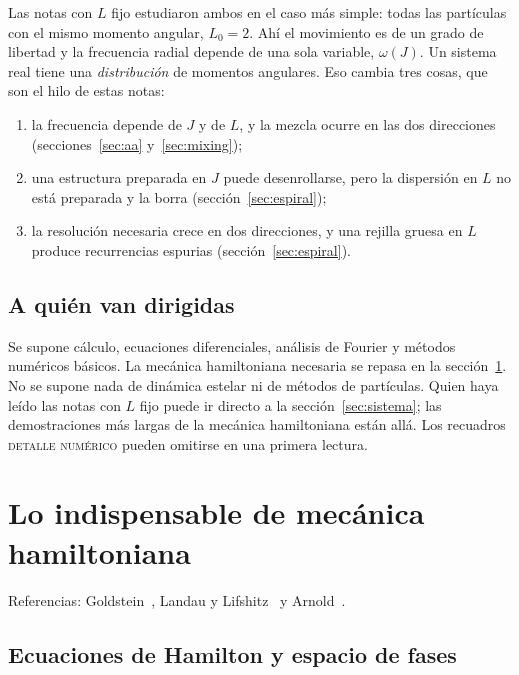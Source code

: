 \documentclass[11pt,a4paper]{article}
\begin{document}
Las notas con $L$ fijo estudiaron ambos en el caso más simple: todas las partículas con
el mismo momento angular, $L_0=2$. Ahí el movimiento es de un grado de libertad y la
frecuencia radial depende de una sola variable, $\omega(J)$. Un sistema real tiene una
\emph{distribución} de momentos angulares. Eso cambia tres cosas, que son el hilo de
estas notas:

\begin{enumerate}
  \item la frecuencia depende de $J$ y de $L$, y la mezcla ocurre en las dos direcciones
    (secciones~\ref{sec:aa} y~\ref{sec:mixing});
  \item una estructura preparada en $J$ puede desenrollarse, pero la dispersión en $L$
    no está preparada y la borra (sección~\ref{sec:espiral});
  \item la resolución necesaria crece en dos direcciones, y una rejilla gruesa en $L$
    produce recurrencias espurias (sección~\ref{sec:espiral}).
\end{enumerate}

\subsection*{A quién van dirigidas}

Se supone cálculo, ecuaciones diferenciales, análisis de Fourier y métodos numéricos
básicos. La mecánica hamiltoniana necesaria se repasa en la sección~\ref{sec:hamilton}.
No se supone nada de dinámica estelar ni de métodos de partículas. Quien haya leído las
notas con $L$ fijo puede ir directo a la sección~\ref{sec:sistema}; las demostraciones
más largas de la mecánica hamiltoniana están allá. Los recuadros \textsc{detalle
numérico} pueden omitirse en una primera lectura.

\section{Lo indispensable de mecánica hamiltoniana}
\label{sec:hamilton}

Referencias: Goldstein~\cite[caps.~8--10]{goldstein2002}, Landau y
Lifshitz~\cite[\S\S40--52]{landau1976} y Arnold~\cite[caps.~8--10]{arnold1989}.

\subsection{Ecuaciones de Hamilton y espacio de fases}
\end{document}
